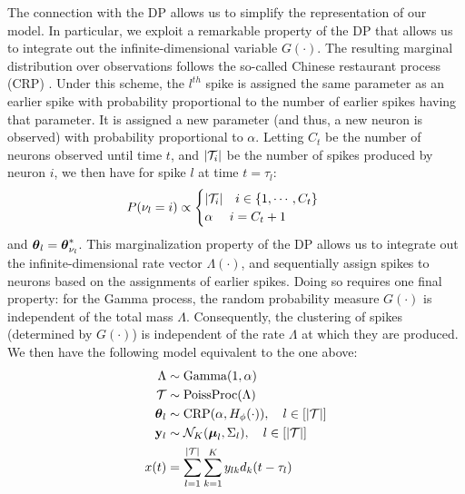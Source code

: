 The connection with the DP allows us to simplify the representation of our model. In particular, we exploit a remarkable property of the DP that
allows us to integrate out the infinite-dimensional variable $G(\cdot)$. The resulting marginal distribution over observations follows the so-called
 Chinese restaurant process (CRP) \citep{Pit2002a}. Under this scheme, the $l^{th}$ spike is assigned the same parameter as an earlier spike with probability 
proportional to the number of earlier spikes having that parameter. It is assigned a new parameter (and thus, a new neuron is observed) with probability 
proportional to $\alpha$. Letting $C_t$ be the number of neurons observed until time $t$, and  $|\mathcal{T}_i|$ be the number of spikes produced by neuron $i$,
we then have for spike $l$ at time $t = \tau_l$: 
\begin{align}
  P({\nu_l} = i) & \propto 
  \begin{cases}
   |\mathcal{T}_i| \quad i \in \{1,\cdots, C_{t}\} \\
   \alpha \quad\ i = C_{t} + 1 \\
  \end{cases}  
\label{eq:crp_marg_pr}
\end{align}
and $\boldsymbol{\theta}_l = \boldsymbol{\theta}^*_{\nu_l}$. 
This marginalization property of the DP allows us to integrate out the infinite-dimensional rate vector $\Lambda(\cdot)$, and sequentially 
assign spikes to neurons based on the assignments of earlier spikes.
Doing so requires one final property: for the Gamma process, the random probability measure $G(\cdot)$ is independent of the total mass $\Lambda$. 
Consequently, the clustering of spikes (determined by $G(\cdot)$) is independent of the rate $\Lambda$ at which they are produced. We then have
 the following model equivalent to the one above:
\begin{subequations}
\begin{align}
  \Lambda & \sim \text{Gamma}(1,\alpha) \\
  \mathcal{T} &\sim \text{PoissProc}(\Lambda) \\
  \boldsymbol{\theta}_l &\sim \text{CRP}(\alpha, H_{\phi}(\cdot)), \quad l \in [|\mathcal{T}|]   \label{eq:CRP}\\
  \mathbf{y}_l &\sim \mathcal{N}_K(\boldsymbol{\mu}_{l}, \Sigma_{l}), \quad  l \in [|\mathcal{T}|]   \label{eq:CRP_mix}\\
  x(t) &=   \sum_{l=1}^{|\mathcal{T}|} \sum_{k=1}^K y_{lk} d_k(t - \tau_{l})
\end{align}
\end{subequations}
